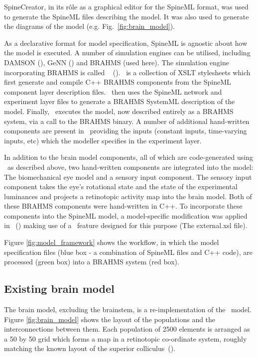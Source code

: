 \documentclass{frontiersSCNS}
\begin{document}
SpineCreator, in its r\^ole as a graphical editor for the SpineML
format, was used to generate the SpineML files describing the
model. It was also used to generate the diagrams of the model
(e.g. Fig.~\ref{fig:brain_model}).

As a declarative format for model specification, SpineML is agnostic
about how the model is executed. A number of simulation
engines can be utilised, including DAMSON (\cite{richmond_damson_2015}), GeNN
(\cite{nowotny_flexible_2011,nowotny_spineml_2014}) and BRAHMS (used
here). The simulation engine incorporating BRAHMS is called \stob~
(\cite{cope_spineml_2_brahms_2015-1}). \stob~is a collection of XSLT
stylesheets which first generate and compile C++ BRAHMS components
from the SpineML component layer description files. \stob~then uses
the SpineML network and experiment layer files to generate a BRAHMS
SystemML description of the model. Finally, \stob~executes the model,
now described entirely as a BRAHMS system, via a call to the BRAHMS
binary. A number of additional hand-written components are present
in \stob~providing the inputs (constant inputs, time-varying inputs,
etc) which the modeller specifies in the experiment layer.

In addition to the brain model components, all of which are
code-generated using \stob~as described above, two hand-written
components are integrated into the model: The biomechanical eye model
and a sensory input component. The sensory input component takes the
eye's rotational state and the state of the experimental luminances
and projects a retinotopic activity map into the brain model. Both of
these BRAHMS components were hand-written in C++. To incorporate these
components into the SpineML model, a model-specific modification was
applied in \stob~(\cite{cope_spineml_2_brahms_2015}) making use of
a \stob~feature designed for this purpose (The external.xsl file).

Figure \ref{fig:model_framework} shows the workflow, in which the
model specification files (blue box - a combination of SpineML files
and C++ code), are processed (green box) into a BRAHMS system (red
box).

\subsection{Existing brain model}

The brain model, excluding the brainstem, is a re-implementation of
the \ccg~model. Figure \ref{fig:brain_model} shows the layout of the
populations and the interconnections between them. Each population of
2500 elements is arranged as a 50 by 50 grid which forms a map in a
retinotopic co-ordinate system, roughly matching the known layout of
the superior colliculus~(\cite{robinson_eye_1972}). %
\end{document}
